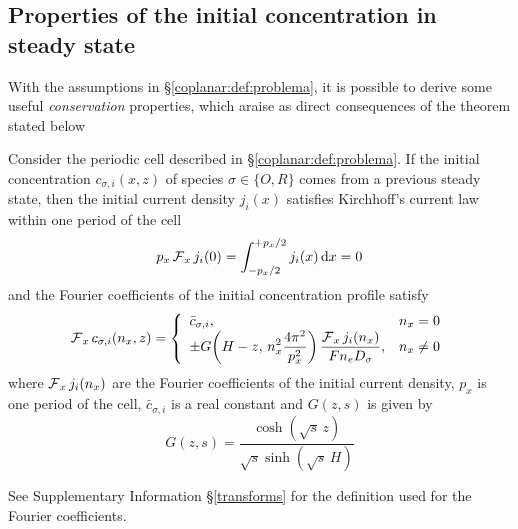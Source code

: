 \subsection{Properties of the initial concentration in steady state}
\label{coplanar:properties:initial}

With the assumptions in \S\ref{coplanar:def:problema},
it is possible to derive some useful \emph{conservation} properties,
which araise as direct consequences of the theorem stated below

\begin{teorema}
	\label{coplanar:teo:ci}
	Consider the periodic cell described in \S\ref{coplanar:def:problema}.
	If the initial concentration $c_{\sigma,i}(x,z)$ of species $\sigma \in \{O, R\}$
	comes from a previous steady state,
	then the initial current density $j_{i}(x)$ satisfies Kirchhoff's current law
	within one period of the cell
	\begin{equation}
		\label{coplanar:eqn:kirchhoff:inicial}
		p_{x} \operatorname{\mathcal{F}}_{x} j_{i}(0)
		= \int_{-p_{x}/2}^{+p_{x}/2} j_{i}(x) \,\mathrm{d}x = 0
	\end{equation}
	and the Fourier coefficients of the initial concentration profile satisfy
	\begin{equation}
		\label{coplanar:eqn:ci}
		\operatorname{\mathcal{F}}_{x} c_{\sigma,i}(n_{x},z) = \left\{
		\begin{array}{ll}
		\bar{c}_{\sigma,i}, & n_{x} = 0
		\\
		\displaystyle
		\pm G\!\left(H-z,\, n_{x}^{2} \frac{4\pi^{2}}{p_{x}^{2}}\right)
		\frac{\operatorname{\mathcal{F}}_{x} j_{i}(n_{x})}{F n_{e} D_{\sigma}}, & n_{x} \neq 0
		\end{array}
		\right.
	\end{equation}
	where $\operatorname{\mathcal{F}}_{x} j_{i}(n_{x})$ are the Fourier coefficients of the initial current density,
	$p_{x}$ is one period of the cell, $\bar{c}_{\sigma,i}$ is a real constant
	and $G(z,s)$ is given by
	\begin{equation}
		\label{coplanar:eqn:G}
		G(z,s) = \frac{\cosh(\sqrt{s}\, z)}{\sqrt{s} \sinh(\sqrt{s}\, H)}
	\end{equation}
\end{teorema}
See Supplementary Information \S\ref{transforms} for the definition used for the Fourier coefficients.

